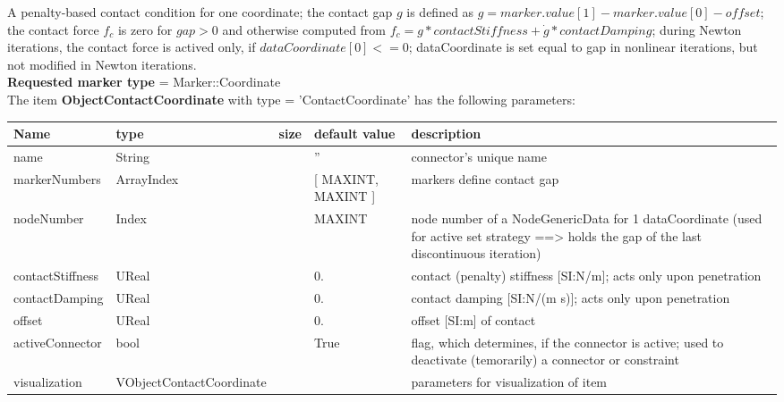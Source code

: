 A penalty-based contact condition for one coordinate; the contact gap $g$ is defined as $g=marker.value[1]- marker.value[0] - offset$; the contact force $f_c$ is zero for $gap>0$ and otherwise computed from $f_c = g*contactStiffness + \dot g*contactDamping$; during Newton iterations, the contact force is actived only, if $dataCoordinate[0] <= 0$; dataCoordinate is set equal to gap in nonlinear iterations, but not modified in Newton iterations.
 \\  {\bf Requested marker type} = Marker::Coordinate \\ 
\vspace{12pt} \noindent The item {\bf ObjectContactCoordinate} with type = 'ContactCoordinate' has the following parameters:\vspace{-1cm}\\ 
\begin{center}
  \footnotesize
  \begin{longtable}{| p{4.5cm} | p{2.5cm} | p{0.5cm} | p{2.5cm} | p{6cm} |}
    \hline
    \bf Name & \bf type & \bf size & \bf default value & \bf description \\ \hline
    name &     String &      &     '' &     connector's unique name\\ \hline
    markerNumbers &     ArrayIndex &      &     [ MAXINT, MAXINT ] &     markers define contact gap\\ \hline
    nodeNumber &     Index &      &     MAXINT &     node number of a NodeGenericData for 1 dataCoordinate (used for active set strategy ==> holds the gap of the last discontinuous iteration)\\ \hline
    contactStiffness &     UReal &      &     0. &     contact (penalty) stiffness [SI:N/m]; acts only upon penetration\\ \hline
    contactDamping &     UReal &      &     0. &     contact damping [SI:N/(m s)]; acts only upon penetration\\ \hline
    offset &     UReal &      &     0. &     offset [SI:m] of contact\\ \hline
    activeConnector &     bool &      &     True &     flag, which determines, if the connector is active; used to deactivate (temorarily) a connector or constraint\\ \hline
    visualization & VObjectContactCoordinate & & & parameters for visualization of item \\ \hline
	  \end{longtable}
	\end{center}
